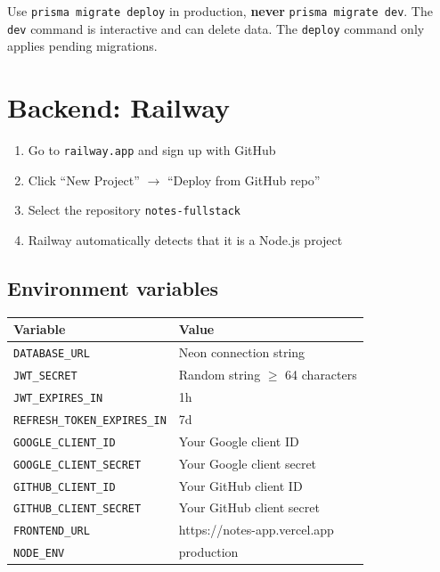 \begin{warnbox}
Use \texttt{prisma migrate deploy} in production, \textbf{never} \texttt{prisma migrate dev}. The \texttt{dev} command is interactive and can delete data. The \texttt{deploy} command only applies pending migrations.
\end{warnbox}

\section{Backend: Railway}

\begin{praticabox}[title={Practice --- Railway setup}]
\begin{enumerate}
  \item Go to \texttt{railway.app} and sign up with GitHub
  \item Click ``New Project'' $\rightarrow$ ``Deploy from GitHub repo''
  \item Select the repository \texttt{notes-fullstack}
  \item Railway automatically detects that it is a Node.js project
\end{enumerate}
\end{praticabox}

\subsection{Environment variables}

\begin{center}
\begin{small}
\begin{tabularx}{\textwidth}{l X}
\toprule
\textbf{Variable} & \textbf{Value} \\
\midrule
\texttt{DATABASE\_URL} & Neon connection string \\
\texttt{JWT\_SECRET} & Random string $\geq$ 64 characters \\
\texttt{JWT\_EXPIRES\_IN} & 1h \\
\texttt{REFRESH\_TOKEN\_EXPIRES\_IN} & 7d \\
\texttt{GOOGLE\_CLIENT\_ID} & Your Google client ID \\
\texttt{GOOGLE\_CLIENT\_SECRET} & Your Google client secret \\
\texttt{GITHUB\_CLIENT\_ID} & Your GitHub client ID \\
\texttt{GITHUB\_CLIENT\_SECRET} & Your GitHub client secret \\
\texttt{FRONTEND\_URL} & https://notes-app.vercel.app \\
\texttt{NODE\_ENV} & production \\
\bottomrule
\end{tabularx}
\end{small}
\end{center}

